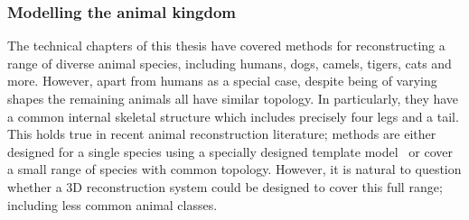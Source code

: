 





\subsubsection{Modelling the animal kingdom}


The technical chapters of this thesis have covered methods for reconstructing a range of diverse animal species, including humans, dogs, camels, tigers, cats and more. However, apart from humans as a special case, despite being of varying shapes the remaining animals all have similar topology. In particularly, they have a common internal skeletal structure which includes precisely four legs and a tail. This holds true in recent animal reconstruction literature; methods are either designed for a single species using a specially designed template model~ or cover a small range of species with common topology. However, it is natural to question whether a 3D reconstruction system could be designed to cover this full range; including less common animal classes. 

